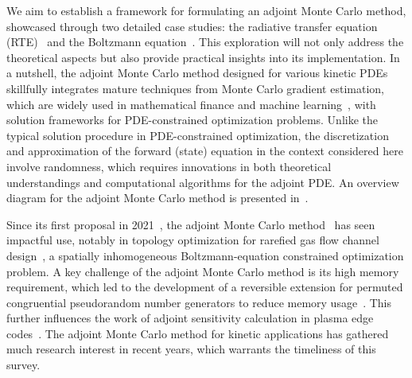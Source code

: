 \documentclass[12pt]{amsart}
\begin{document}
We aim to establish a framework for formulating an adjoint Monte Carlo method, showcased through two detailed case studies: the radiative transfer equation (RTE)~\cite{li2022monte} and the Boltzmann equation~\cite{caflisch2021adjoint,yang2023adjoint}. This exploration will not only address the theoretical aspects but also provide practical insights into its implementation. In a nutshell, the adjoint Monte Carlo method designed for various kinetic PDEs skillfully integrates mature techniques from Monte Carlo gradient estimation, which are widely used in mathematical finance and machine learning~\cite{glasserman2013monte,mohamed2019monte}, with solution frameworks for PDE-constrained optimization problems. Unlike the typical solution procedure in PDE-constrained optimization, the discretization and approximation of the forward (state) equation in the context considered here involve randomness, which requires innovations in both theoretical understandings and computational algorithms for the adjoint PDE. An overview diagram for the adjoint Monte Carlo method is presented in~.

Since its first proposal in 2021~\cite{caflisch2021adjoint}, the adjoint Monte Carlo method~\cite{yang2023adjoint,li2022monte} has seen impactful use, notably in topology optimization for rarefied gas flow channel design~\cite{guan2023topology,yuan2023efficient}, a spatially inhomogeneous Boltzmann-equation constrained optimization problem. A key challenge of the adjoint Monte Carlo method is its high memory requirement, which led to the development of a reversible extension for permuted congruential pseudorandom number generators to reduce memory usage~\cite{lovbak2023reversible}. This further influences the work of adjoint sensitivity calculation in plasma edge codes~\cite{carli2023algorithmic}. The adjoint Monte Carlo method for kinetic applications has gathered much research interest in recent years, which warrants the timeliness of this survey. 
\end{document}
